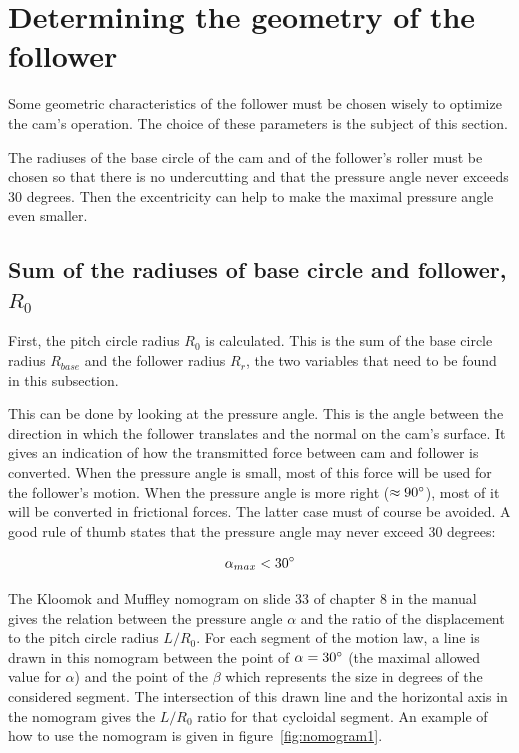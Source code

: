 \documentclass[a4paper]{article}
\begin{document}
\section{Determining the geometry of the follower}
\label{sec:2}

Some geometric characteristics of the follower must be chosen wisely to optimize the cam's operation. The choice of these parameters is the subject of this section.

The radiuses of the base circle of the cam and of the follower's roller must be chosen so that there is no undercutting and that the pressure angle never exceeds 30 degrees. Then the excentricity can help to make the maximal pressure angle even smaller.

\subsection{Sum of the radiuses of base circle and follower, \(R_0\)}

First, the pitch circle radius \(R_0\) is calculated. This is the sum of the base circle radius \(R_{base}\) and the follower radius \(R_r\), the two variables that need to be found in this subsection. 

This can be done by looking at the pressure angle. This is the angle between the direction in which the follower translates and the normal on the cam's surface. It gives an indication of how the transmitted force between cam and follower is converted. When the pressure angle is small, most of this force will be used for the follower's motion. When the pressure angle is more right (\(\approx90\degree\)), most of it will be converted in frictional forces. The latter case must of course be avoided. A good rule of thumb states that the pressure angle may never exceed 30 degrees:

\begin{equation}
	\alpha_{max} < 30 \degree 
\end{equation}

The Kloomok and Muffley nomogram on slide 33 of chapter 8 in the manual~\cite{cursus} gives the relation between the pressure angle \(\alpha\) and the ratio of the displacement to the pitch circle radius \(L/R_0\). For each segment of the motion law, a line is drawn in this nomogram between the point of \(\alpha=30 \degree\) (the maximal allowed value for \(\alpha\)) and the point of the \(\beta\) which represents the size in degrees of the considered segment. The intersection of this drawn line and the horizontal axis in the nomogram gives the \(L/R_0\) ratio for that cycloidal segment. An example of how to use the nomogram is given in figure~\ref{fig:nomogram1}.
\end{document}
